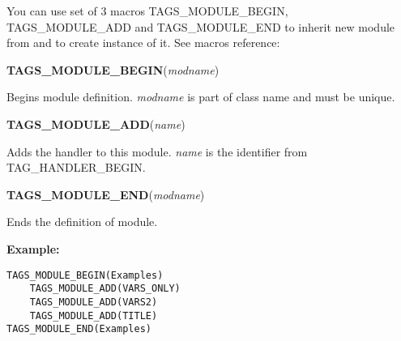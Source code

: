 
You can use set of 3 macros TAGS_MODULE_BEGIN, TAGS_MODULE_ADD and 
TAGS_MODULE_END to inherit new module from
 and to create instance of it.
See macros reference:

{\bf TAGS_MODULE_BEGIN}({\it modname})

Begins module definition. {\it modname} is part of class name and must
be unique.

{\bf TAGS_MODULE_ADD}({\it name})

Adds the handler to this module. {\it name} is the identifier from
TAG_HANDLER_BEGIN.

{\bf TAGS_MODULE_END}({\it modname})

Ends the definition of module.

{\bf Example:}

\begin{verbatim}
TAGS_MODULE_BEGIN(Examples)
    TAGS_MODULE_ADD(VARS_ONLY)
    TAGS_MODULE_ADD(VARS2)
    TAGS_MODULE_ADD(TITLE)
TAGS_MODULE_END(Examples)
\end{verbatim}
